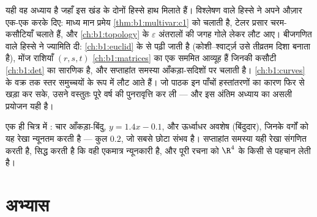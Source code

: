 \begin{remark}[पुस्तक 3 के भीतर परिप्रेक्ष्य: वर्ष, बंद]
\label{rem:b1:multivar:perspectives}
यही वह अध्याय है जहाँ इस खंड के दोनों हिस्से हाथ मिलाते हैं। विश्लेषण वाले
हिस्से ने अपने औज़ार एक-एक  करके दिए: माध्य मान प्रमेय
\cref{thm:b1:multivar:c1} को चलाती है, टेलर प्रसार चरम-कसौटियाँ चलाते हैं,
और \cref{ch:b1:topology} के $\varepsilon$ अंतरालों की जगह गोले लेकर लौट
आए। बीजगणित वाले हिस्से ने ज्यामिति दी:  \cref{ch:b1:euclid} के
 से पढ़ी जाती है (कोशी--श्वार्ट्ज़ उसे तीव्रतम दिशा बनाता है),
मोंज राशियाँ $(r, s, t)$ \cref{ch:b1:matrices} का एक सममित आव्यूह हैं
जिनकी कसौटी \cref{ch:b1:det} का सारणिक है, और सप्ताहांत समस्या
आँकड़ा-सदिशों पर  चलाती है। \cref{ch:b1:curves} के वक्र तक
स्तर समुच्चयों के रूप में लौट आते हैं। जो पाठक इन पाँचों हस्तांतरणों का
कारण फिर से खड़ा कर सके, उसने वस्तुतः पूरे वर्ष की पुनरावृत्ति कर ली ---
और इस अंतिम अध्याय का असली प्रयोजन यही है।
\end{remark}

\begin{omfigure}

{\small एक ही चित्र में : चार आँकड़ा-बिंदु,  $y =
1.4x - 0.1$, और ऊर्ध्वाधर अवशेष (बिंदुदार), जिनके वर्गों को यह रेखा
न्यूनतम करती है --- कुल $0.2$, जो सबसे छोटा संभव है। सप्ताहांत समस्या यही
रेखा संगणित करती है, सिद्ध करती है कि वही एकमात्र न्यूनकारी है, और पूरी
रचना को $\R^4$ के किसी  से पहचान लेती है।}
\end{omfigure}

\section{अभ्यास}

